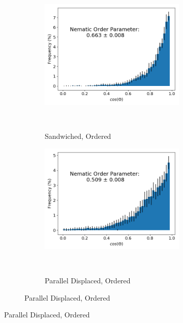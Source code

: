 \documentclass{article}
\begin{document}
  \begin{figure}[!htb]
  \begin{subfigure}{\linewidth}
        \centering
        \begin{subfigure}{0.45\linewidth}
                \centering
                \includegraphics[width=\linewidth]{layered_nematic_order.png}
                \caption{Sandwiched, Ordered}~\label{fig:sandwich_nematic}
        \end{subfigure}%
        \begin{subfigure}{0.45\linewidth}
                \centering
                \includegraphics[width=\linewidth]{offset_nematic_order.png}
                \caption{Parallel Displaced, Ordered}~\label{fig:offset_nematic}

\end{subfigure}
\end{subfigure}
\end{figure}
\end{document}

